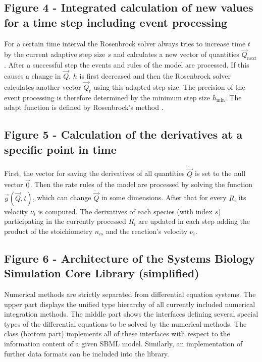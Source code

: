 \documentclass[10pt]{bmc_article}
\newenvironment{bmcformat}{\fussy\setboolean{publ}{true}}{\fussy}
\begin{document}
\begin{bmcformat}
{\subsection*{Figure 4 - Integrated calculation of new values for a time step including event processing}
For a certain time interval the Rosenbrock solver  always tries to increase time $t$ by the current adaptive
step size $s$ and calculates a new vector of quantities $\vec{Q}_{\mathrm{next}}$.
After a successful step the events and rules of the model are processed.
If this causes a change in $\vec{Q}$, $h$ is first decreased and then the Rosenbrock solver calculates another vector $\vec{Q}_{t}$ using this adapted step size.
The precision of the event processing is therefore determined by the minimum step size $h_{\min}$.
The $\mathrm{adapt}$ function is defined by Rosenbrock's method \cite{Press1993}.

\subsection*{Figure 5 - Calculation of the derivatives at a specific point in time}
First, the vector for saving the derivatives of all quantities $\dot{\vec{Q}}$ is set to the null vector $\vec{0}$.
Then the rate rules of the model are processed by solving the function $\vec{g}(\vec{Q}, t)$, which can change $\dot{\vec{Q}}$ in some dimensions.
After that for every  $R_i$ its velocity $\nu_i$ is computed.
The derivatives of each species (with index $s$) participating in the currently processed  $R_i$ are updated
in each step adding the product of the stoichiometry $n_{is}$ and the reaction's velocity $\nu_i$.

\subsection*{Figure 6 - Architecture of the Systems Biology Simulation Core Library (simplified)}
Numerical methods are strictly separated from differential equation systems. The
upper part displays the unified type hierarchy of all currently included numerical integration
methods. The middle part shows the interfaces defining several
special types of the differential equations to be solved by the numerical
methods.
The class \SBMLinterpreter (bottom part) implements all of these interfaces
with respect to the information content of a given \acs{SBML} model. Similarly, an
implementation of further data formats can be included into the
library.

}
\end{bmcformat}
\end{document}
